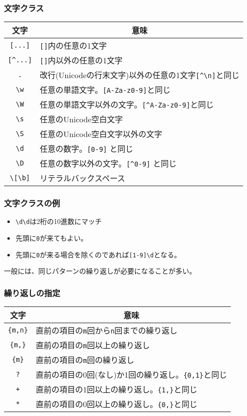\documentclass[dvipsk]{beamer}
\begin{document}
\begin{frame}[containsverbatim]
 \frametitle{文字クラス}
\begin{center}
 \begin{tabular}{|c|m{}|}\hline
  文字&\multicolumn{1}{c|}{意味}\\\hline
  \texttt{[...]}&\texttt{[]}内の任意の1文字\\\hline
  \verb+[^...]+& \texttt{[]}内以外の任意の1文字\\ \hline
  \verb+.+& 改行(Unicodeの行末文字)以外の任意の1文字\verb+[^\n]+と同じ\\ \hline
  \verb+\w+& 任意の単語文字。\verb+[A-Za-z0-9]+と同じ\\ \hline
  \verb+\W+& 任意の単語文字以外の文字。\verb+[^A-Za-z0-9]+と同じ\\ \hline
  \verb+\s+& 任意のUnicode空白文字\\ \hline
  \verb+\S+& 任意のUnicode空白文字以外の文字\\ \hline
  \verb+\d+& 任意の数字。\verb+[0-9]+ と同じ\\ \hline
  \verb+\D+&任意の数字以外の文字。\verb+[^0-9]+ と同じ\\\hline
  \verb+\[\b]+& リテラルバックスペース\\ \hline
 \end{tabular}
\end{center}
\end{frame}
\begin{frame}[containsverbatim]
 \frametitle{文字クラスの例}
\begin{itemize}
 \item \verb+\d\d+は2桁の10進数にマッチ
 \item 先頭に\verb+0+が来てもよい。
 \item 先頭に\verb+0+が来る場合を除くのであれば\verb+[1-9]\d+となる。
\end{itemize}
一般には、同じパターンの繰り返しが必要になることが多い。
\end{frame}
\begin{frame}[containsverbatim]
 \frametitle{繰り返しの指定}
\begin{center}
 \begin{tabular}{|c|m{}|}\hline
  文字&\multicolumn{1}{c|}{意味}\\\hline
\verb+{m,n}+&直前の項目の\texttt{m}回から\texttt{n}回までの繰り返し\\\hline
\verb+{m,}+&直前の項目の\texttt{m}回以上の繰り返し\\\hline
\verb+{m}+&直前の項目の\texttt{m}回の繰り返し\\\hline
\verb+?+&直前の項目の0回(なし)か1回の繰り返し。\verb+{0,1}+と同じ\\\hline
\verb-+-&直前の項目の1回以上の繰り返し。\verb+{1,}+と同じ\\\hline
\verb+*+&直前の項目の0回以上の繰り返し。\verb+{0,}+と同じ\\\hline
\end{tabular}
\end{center}
\end{frame}
\end{document}
